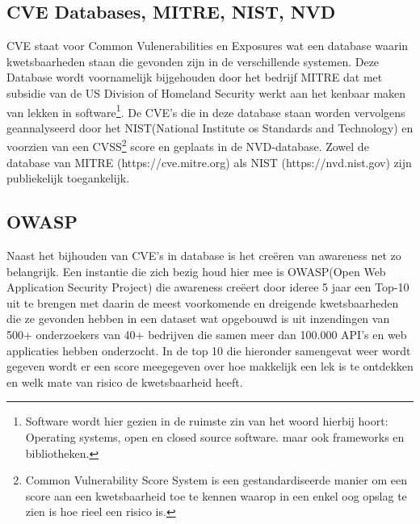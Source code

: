 \subsection{CVE Databases, MITRE, NIST, NVD}\label{subsec:mitre-nist-nvd}
CVE staat voor Common Vulenerabilities en Exposures wat een database waarin kwetsbaarheden staan die gevonden zijn in de verschillende systemen.
Deze Database wordt voornamelijk bijgehouden door het bedrijf MITRE dat met subsidie van de US Division of Homeland Security werkt aan het kenbaar maken van lekken in software\footnote{Software wordt hier gezien in de ruimste zin van het woord hierbij hoort: Operating systems, open en closed source software. maar ook frameworks en bibliotheken.}.
De CVE's die in deze database staan worden vervolgens geannalyseerd door het NIST(National Institute os Standards and Technology) en voorzien van een CVSS\footnote{Common Vulnerability Score System is een gestandardiseerde manier om een score aan een kwetsbaarheid toe te kennen waarop in een enkel oog opslag te zien is hoe rieel een risico is.} score en geplaats in de NVD-database.
Zowel de database van MITRE (https://cve.mitre.org) als NIST (https://nvd.nist.gov) zijn publiekelijk toegankelijk.

\subsection{OWASP}\label{subsec:owasp}
Naast het bijhouden van CVE's in database is het creëren van awareness net zo belangrijk.
Een instantie die zich bezig houd hier mee is OWASP(Open Web Application Security Project) die awareness creëert door ideree 5 jaar een Top-10 uit te brengen met daarin de meest voorkomende en dreigende kwetsbaarheden die ze gevonden hebben in een dataset wat opgebouwd is uit inzendingen van 500+ onderzoekers van 40+ bedrijven die samen meer dan 100.000 API's en web applicaties hebben onderzocht.
In de top 10 die hieronder samengevat weer wordt gegeven wordt er een score meegegeven over hoe makkelijk een lek is te ontdekken en welk mate van risico de kwetsbaarheid heeft.


